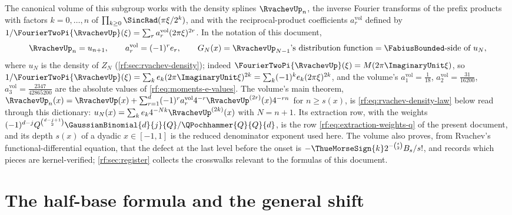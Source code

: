 \documentclass[11pt,oneside]{article}
\theoremstyle{plain}
\theoremstyle{definition}
\theoremstyle{remark}
\newcommand{\Fb}{\FabiusBounded}            %
\newcommand{\up}{\RvachevUp}                %
\newcommand{\tm}[1]{\ThueMorseSign{#1}}     %
\newcommand{\qb}[3]{\GaussianBinomial{#1}{#2}{#3}}
\newcommand{\qp}[3]{\QPochhammer{#1}{#2}{#3}}
\newcommand{\amvol}[1]{a^{\mathrm{vol}}_{#1}} %
\begin{document}
The canonical volume of this subgroup \cite{proveit-due} works with the
density splines $\up_{n}$, the inverse Fourier transforms of the prefix
products with factors $k=0,\ldots,n$ of
$\prod_{k\ge0}\SincRad(\pi\xi/2^{k})$, and with the reciprocal-product
coefficients $\amvol{r}$ defined by $1/\FourierTwoPi{\up}(\xi)=\sum_{r}\amvol{r}(2\pi\xi)^{2r}$.
In the notation of this document,
\begin{equation}
 \up_{n}=u_{n+1},\qquad
 \amvol{r}=(-1)^{r}e_{r},\qquad
 G_{N}(x)=\up_{N-1}\text{'s distribution function}=\Fb\text{-side of }u_{N},
 \label{rf:eq:extraction-dictionary}
\end{equation}
where $u_{N}$ is the density of $Z_{N}$ (\cref{rf:sec:rvachev-density});
indeed $\FourierTwoPi{\up}(\xi)=M(2\pi\ImaginaryUnit\xi)$, so
$1/\FourierTwoPi{\up}(\xi)=\sum_{k}e_{k}(2\pi\ImaginaryUnit\xi)^{2k}
=\sum_{k}(-1)^{k}e_{k}(2\pi\xi)^{2k}$, and the volume's
$\amvol{1}=\tfrac1{18}$, $\amvol{2}=\tfrac{31}{16200}$, $\amvol{3}=\tfrac{2347}{42865200}$
are the absolute values of \cref{rf:eq:moments-e-values}.  The volume's main
theorem, $\up_{n}(x)=\up(x)+\sum_{r=1}^{d}(-1)^{r}\amvol{r}4^{-r}\up^{(2r)}(x)4^{-rn}$
for $n\ge s(x)$, is \cref{rf:eq:rvachev-density-law} below read through this
dictionary: $u_{N}(x)=\sum_{k}e_{k}4^{-Nk}\up^{(2k)}(x)$ with $N=n+1$.  Its
extraction row, with the weights
$(-1)^{d-j}Q^{\binom{d-j+1}{2}}\qb{d}{j}{Q}/\qp{Q}{Q}{d}$, is the row
\cref{rf:eq:extraction-weights-q} of the present document, and its depth
$s(x)$ of a dyadic $x\in[-1,1]$ is the reduced denominator exponent used
here.  The volume also proves, from Rvachev's functional-differential
equation, that the defect at the last level before the onset is
$-\tm{k}2^{-\binom{s}{2}}B_{s}/s!$, and records which pieces are
kernel-verified; \cref{rf:sec:register} collects the crosswalks relevant
to the formulas of this document.

\section{The half-base formula and the general shift}
\label{rf:sec:halfbase}
\end{document}
